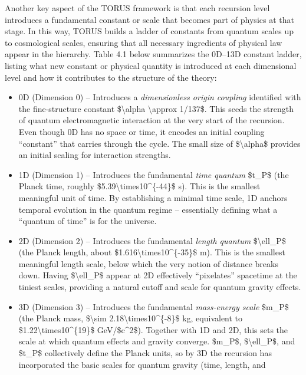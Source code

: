 \documentclass[]{article}
\begin{document}
Another key aspect of the TORUS framework is that each recursion level
introduces a fundamental constant or scale that becomes part of physics
at that stage. In this way, TORUS builds a ladder of constants from
quantum scales up to cosmological scales, ensuring that all necessary
ingredients of physical law appear in the hierarchy. Table 4.1 below
summarizes the 0D--13D constant ladder, listing what new constant or
physical quantity is introduced at each dimensional level and how it
contributes to the structure of the theory:

\begin{itemize}
\item
  0D (Dimension 0) -- Introduces a \emph{dimensionless origin coupling}
  identified with the fine-structure constant \$\textbackslash{}alpha
  \textbackslash{}approx 1/137\$. This seeds the strength of quantum
  electromagnetic interaction at the very start of the recursion. Even
  though 0D has no space or time, it encodes an initial coupling
  ``constant'' that carries through the cycle. The small size of
  \$\textbackslash{}alpha\$ provides an initial scaling for interaction
  strengths.
\item
  1D (Dimension 1) -- Introduces the fundamental \emph{time quantum}
  \$t\_P\$ (the Planck time, roughly
  \$5.39\textbackslash{}times10\^{}\{-44\}\$ s). This is the smallest
  meaningful unit of time. By establishing a minimal time scale, 1D
  anchors temporal evolution in the quantum regime -- essentially
  defining what a ``quantum of time'' is for the universe.
\item
  2D (Dimension 2) -- Introduces the fundamental \emph{length quantum}
  \$\textbackslash{}ell\_P\$ (the Planck length, about
  \$1.616\textbackslash{}times10\^{}\{-35\}\$ m). This is the smallest
  meaningful length scale, below which the very notion of distance
  breaks down. Having \$\textbackslash{}ell\_P\$ appear at 2D
  effectively ``pixelates'' spacetime at the tiniest scales, providing a
  natural cutoff and scale for quantum gravity effects.
\item
  3D (Dimension 3) -- Introduces the fundamental \emph{mass-energy
  scale} \$m\_P\$ (the Planck mass, \$\textbackslash{}sim
  2.18\textbackslash{}times10\^{}\{-8\}\$ kg, equivalent to
  \$1.22\textbackslash{}times10\^{}\{19\}\$ GeV/\$c\^{}2\$). Together
  with 1D and 2D, this sets the scale at which quantum effects and
  gravity converge. \$m\_P\$, \$\textbackslash{}ell\_P\$, and \$t\_P\$
  collectively define the Planck units, so by 3D the recursion has
  incorporated the basic scales for quantum gravity (time, length, and

\end{itemize}
\end{document}

